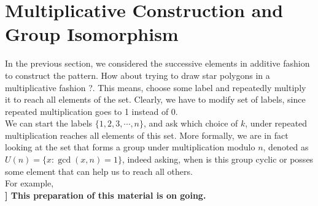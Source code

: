 \documentclass{article}
\begin{document}
\section{Multiplicative Construction and Group Isomorphism}
In the previous section, we considered the successive elements in additive fashion to construct the pattern. How about trying to draw star polygons in a multiplicative fashion ?. This means, choose some label and repeatedly multiply it to reach all elements of the set. Clearly, we have to modify set of labels, since repeated multiplication goes to 1 instead of 0.\\[2mm]
We can start the labels $\{1,2,3,\cdots,n\}$, and ask which choice of $k$, under repeated multiplication reaches all elements of this set. More formally, we are in fact looking at the set that forms a group under multiplication modulo $n$, denoted as $U(n) = \{x: \gcd(x,n) =1\}$, indeed asking, when is this group cyclic or posses some element that can help us to reach all others.\\[2mm]
For example, \\[4mm]
\textbf{]  This preparation of this material is on going.}
\end{document}
